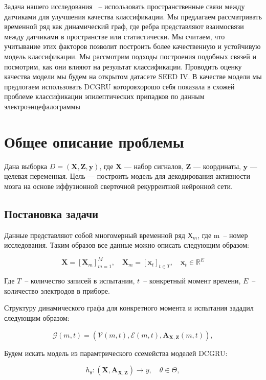 \documentclass[12pt, twoside]{article}
\begin{document}
Задача нашего исследования ~-- использовать пространственные связи между датчиками для улучшения качества классификации. Мы предлагаем рассматривать временной ряд как динамический граф, где ребра представляют взаимосвязи между датчиками в пространстве или статистически. Мы считаем, что учитывание этих факторов позволит построить более качественную и устойчивую модель классификации. Мы рассмотрим подходы построения подобных связей и посмотрим, как они влияют на результат классификации. Проводить оценку качества модели мы будем на открытом датасете SEED IV. В качестве модели мы предлогаем использовать DCGRU которояхорошо себя показала в схожей проблеме классификации эпилептических припадков по данным электроэнцефалограммы \cite{DCGRU}


\section{Общее описание проблемы}

Дана выборка \( D = (\mathbf{X}, \mathbf{Z}, \mathbf{y}) \), где \(\mathbf{X}\) — набор сигналов, \(\mathbf{Z}\) — координаты, \(\mathbf{y}\) — целевая переменная. Цель — построить модель для декодирования активности мозга на основе иффузионной сверточной рекуррентной нейронной сети.

\subsection{Постановка задачи}

Данные представляют собой многомерный временной ряд $\mathbf{Х}_m$, где  m~-- номер исследования.
Таким образов все данные можно описать следующим образом:

$$
\mathbf{X} = [\mathbf{X}_m]_{m=1}^M, \quad \mathbf{X}_m = [\mathbf{x}_t]_{t \in T}, \quad \mathbf{x}_t \in \mathbb{R}^E
$$

Где $T$~-- количество записей в испытании, $t$~-- конкретный момент времени, $E$~-- количество электродов в приборе.

Структуру динамического графа для конкретного момента и испытания зададил следующим образом:

$$
\mathcal{G}(m, t) = \left( \mathcal{V}(m, t), \mathcal{E}(m, t), \mathbf{A}_{\mathbf{X}, \mathbf{Z}}(m, t) \right),
$$

Будем искать модель из парамтрического ссемейства моделей DCGRU:

$$
h_\theta : (\mathbf{X}, \mathbf{A}_{\mathbf{X}, \mathbf{Z}}) \to y, \quad \theta \in \Theta,
$$
\end{document}
